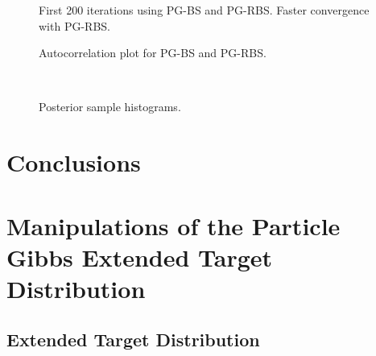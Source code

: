 \documentclass{article}
\begin{document}
\begin{figure}
\centering

\caption{First 200 iterations using PG-BS and PG-RBS. Faster convergence with PG-RBS.}
\label{fig:chain_init}
\end{figure}

\begin{figure}
\centering

\caption{Autocorrelation plot for PG-BS and PG-RBS.}
\label{fig:acf}
\end{figure}

\begin{figure}
\centering
\subfloat[PG-BS (N=100)]{  }
\subfloat[PG-BS (N=200)]{  } \\
\subfloat[PG-RBS (N=100)]{  }
\caption{Posterior sample histograms.}
\label{fig:sample_hist}
\end{figure}


\section{Conclusions}




\appendix

\section{Manipulations of the Particle Gibbs Extended Target Distribution}

\subsection{Extended Target Distribution}
\end{document}

